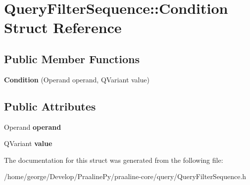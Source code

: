\hypertarget{struct_query_filter_sequence_1_1_condition}{}\section{Query\+Filter\+Sequence\+:\+:Condition Struct Reference}
\label{struct_query_filter_sequence_1_1_condition}
\subsection*{Public Member Functions}
\begin{DoxyCompactItemize}
\item 
\mbox{\label{struct_query_filter_sequence_1_1_condition_a0a920994b04c9da78f681ff5af694d3e}} 
{\bfseries Condition} (Operand operand, Q\+Variant value)
\end{DoxyCompactItemize}
\subsection*{Public Attributes}
\begin{DoxyCompactItemize}
\item 
\mbox{\label{struct_query_filter_sequence_1_1_condition_a24d5a6001f659ea93a2ae450d1dc1508}} 
Operand {\bfseries operand}
\item 
\mbox{\label{struct_query_filter_sequence_1_1_condition_ae0243c75f0555a7f29e355f2a880209b}} 
Q\+Variant {\bfseries value}
\end{DoxyCompactItemize}


The documentation for this struct was generated from the following file\+:\begin{DoxyCompactItemize}
\item 
/home/george/\+Develop/\+Praaline\+Py/praaline-\/core/query/Query\+Filter\+Sequence.\+h\end{DoxyCompactItemize}

